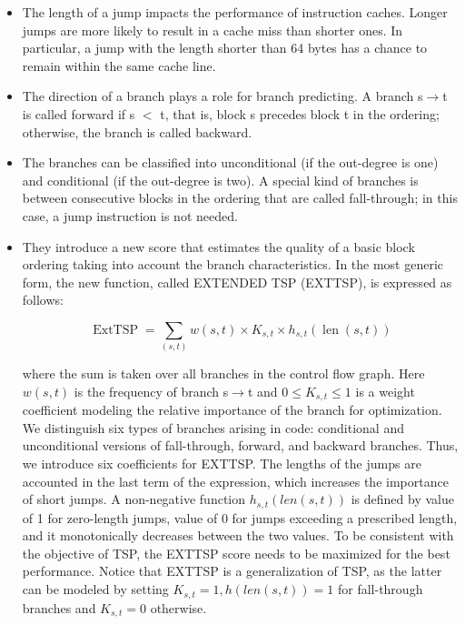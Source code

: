 \begin{itemize}
\item The length of a jump impacts the performance of instruction caches. Longer jumps are more likely to result
in a cache miss than shorter ones. In particular, a jump
with the length shorter than 64 bytes has a chance to
remain within the same cache line.

\item The direction of a branch plays a role for branch predicting. A branch s$\rightarrow$t is called forward if s $<$ t, that is,
block s precedes block t in the ordering; otherwise, the
branch is called backward.

\item The branches can be classified into unconditional (if the
out-degree is one) and conditional (if the out-degree is
two). A special kind of branches is between consecutive
blocks in the ordering that are called fall-through; in this
case, a jump instruction is not needed.

\item They introduce a new score that estimates the quality
of a basic block ordering taking into account the branch
characteristics. In the most generic form, the new function,
called EXTENDED TSP (EXTTSP), is expressed as follows:

$$\operatorname{ExtTSP}=\sum_{(s, t)} w(s, t) \times K_{s, t} \times h_{s, t}(\operatorname{len}(s, t))$$


where the sum is taken over all branches in the control
flow graph. Here $w(s, t)$ is the frequency of branch s$\rightarrow$t and
$0 \leq K_{s,t} \leq 1$ is a weight coefficient modeling the relative
importance of the branch for optimization. We distinguish
six types of branches arising in code: conditional and unconditional versions of fall-through, forward, and backward
branches. Thus, we introduce six coefficients for EXTTSP.
The lengths of the jumps are accounted in the last term of the
expression, which increases the importance of short jumps.
A non-negative function $h_{s,t}(len(s, t))$ is defined by value
of 1 for zero-length jumps, value of 0 for jumps exceeding a
prescribed length, and it monotonically decreases between
the two values. To be consistent with the objective of TSP,
the EXTTSP score needs to be maximized for the best performance. Notice that EXTTSP is a generalization of TSP, as the
latter can be modeled by setting $K_{s,t} = 1, h(len(s, t)) = 1$
for fall-through branches and $K_{s,t} = 0$ otherwise.


\end{itemize}


